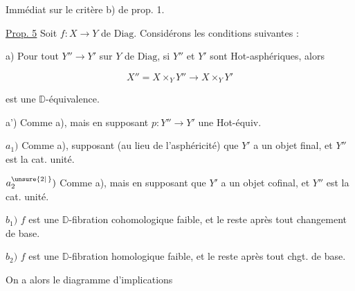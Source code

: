  Immédiat sur le critère b) de prop. 1.



\uline{Prop. 5} Soit $f:X\to Y$ de $\mathrm{Diag}$. Considérons les conditions suivantes :

a) Pour tout $Y''\to Y'$ sur $Y$ de $\mathrm{Diag}$, si $Y''$ et $Y'$ sont Hot-asphériques, alors

\[
X''=X\times_Y Y''\longrightarrow X\times_Y Y'
\]

est une $\mathbb D$-équivalence.


a') Comme a), mais en supposant $p:Y''\to Y'$ une Hot-équiv. 


$a_1)$ Comme a),   supposant (au lieu de l'asphéricité) que $Y'$ a un objet final, et $Y''$ est la cat. unité.

$a^{\unsure{2|\,}}_2)$ Comme a),  mais en supposant que $Y'$ a un objet cofinal, et $Y''$ est la cat. unité.

$b_1)$ $f$ est une $\mathbb D$-fibration cohomologique faible, et le reste après tout changement de base.

$b_2)$ $f$ est une $\mathbb D$-fibration homologique faible, et le reste après tout chgt. de base.

On a alors le diagramme d'implications 


